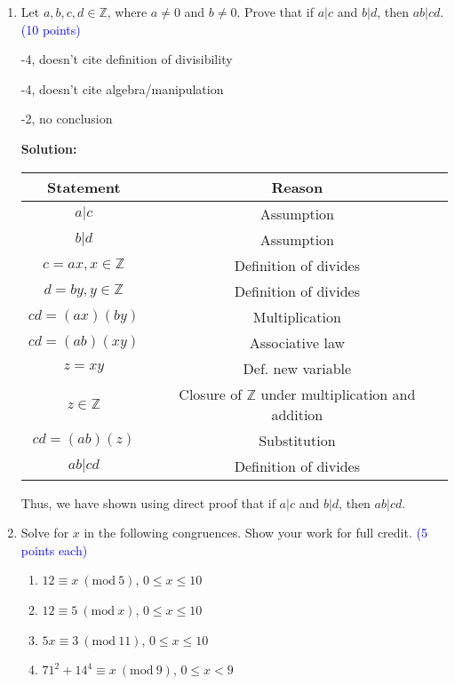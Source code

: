 \documentclass{article}
\newcommand{\pt}[1]{\textcolor{blue}{(#1 points)}}
\newcommand{\pte}[1]{\textcolor{blue}{(#1 points each)}}
\newcommand{\Mod}[1]{\ (\mathrm{mod}\ #1)}
\newenvironment{solution}
{
\par
\color{blue}
\textbf{Solution:}
}
{
\par
}
\newenvironment{rubric}
{
\par
\begin{spacing}{.6}
\begin{itshape}
\color{red}

}
{
\end{itshape}
\end{spacing}
\par
}
\begin{document}
\clearpage
\begin{enumerate}



\item Let $a,b,c,d \in \mathbb{Z}$, where $a \neq 0$ and $b \neq 0$. Prove that if $a|c$ and $b|d$, then $ab|cd$. \pt{10}

\begin{rubric}
-4, doesn't cite definition of divisibility

-4, doesn't cite algebra/manipulation

-2, no conclusion
\end{rubric}

\vspace{2mm}
\begin{solution}
\begin{tabular}{c|c}
    Statement & Reason \\
    \hline
    $a|c$ & Assumption \\
    $b|d$ & Assumption \\
    $c=ax, x \in \mathbb{Z}$ & Definition of divides \\
    $d=by, y \in \mathbb{Z}$ & Definition of divides \\
    $cd=(ax)(by)$ & Multiplication \\
    $cd=(ab)(xy)$ & Associative law \\
    $z = xy$ & Def. new variable \\
    $z \in \mathbb{Z}$ & Closure of $\mathbb{Z}$ under multiplication and addition \\
    $cd = (ab)(z)$ & Substitution \\
    $ab|cd$ & Definition of divides\\
\end{tabular}
Thus, we have shown using direct proof that if $a|c$ and $b|d$, then $ab|cd$. \square
\end{solution}

\item Solve for $x$ in the following congruences. Show your work for full credit. \pte{5}
\begin{enumerate}
    \item $12 \equiv x \Mod{5}$, $0 \leq x \leq 10$
    \item $12 \equiv 5 \Mod{x}$, $0 \leq x \leq 10$
    \item $5x \equiv 3\Mod{11}$, $0 \leq x \leq 10$
    \item $71^2 + 14^4 \equiv x\Mod{9}$, $0 \leq x < 9$
\end{enumerate}


\end{enumerate}
\end{document}
